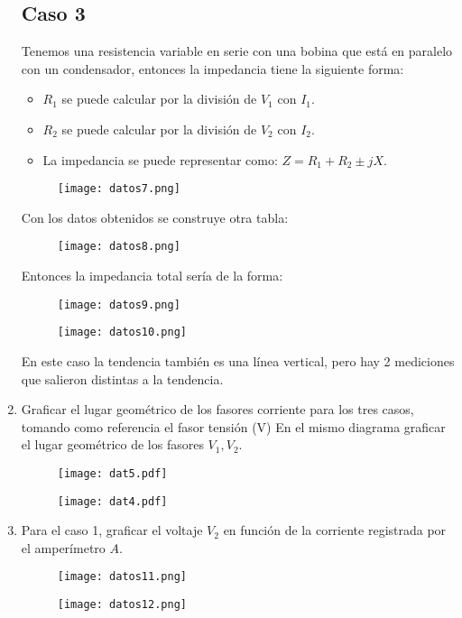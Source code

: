 \documentclass[a4paper,12pt]{report}
\begin{document}
\begin{enumerate}
\subsection*{Caso 3}
Tenemos una resistencia variable en serie con una bobina que está en paralelo con un condensador, entonces la impedancia tiene la siguiente forma:
\begin{itemize}
\item $R_{1}$ se puede calcular por la división de $V_{1}$ con $I_{1}$.
\item $R_{2}$ se puede calcular por la división de $V_{2}$ con $I_{2}$.
\item La impedancia se puede representar como: $Z = R_{1} + R_{2} \pm jX$. 
\end{itemize}
\begin{figure}[H]
\centering
\texttt{[image: datos7.png]}
\end{figure}
Con los datos obtenidos se construye otra tabla:
\begin{figure}[H]
\centering
\texttt{[image: datos8.png]}
\end{figure}
Entonces la impedancia total sería de la forma:
\begin{figure}[H]
\centering
\texttt{[image: datos9.png]}
\end{figure}
\begin{figure}[H]
\centering
\texttt{[image: datos10.png]}
\end{figure}
En este caso la tendencia también es una línea vertical, pero hay 2 mediciones que salieron distintas a la tendencia.
\item Graficar el lugar geométrico de los fasores corriente para los tres casos, tomando como referencia el fasor tensión (V) En el mismo diagrama graficar el lugar geométrico de los fasores $V_{1}, V_{2}$.
\begin{figure}[H]
\centering
\texttt{[image: dat5.pdf]}
\end{figure}
\begin{figure}[H]
\centering
\texttt{[image: dat4.pdf]}
\end{figure}
\item Para el caso 1, graficar el voltaje $V_{2}$ en función de la corriente registrada por el amperímetro $A$.
\begin{figure}[H]
\centering
\texttt{[image: datos11.png]}
\end{figure}
\begin{figure}[H]
\centering
\texttt{[image: datos12.png]}

\end{figure}
\end{enumerate}
\end{document}
